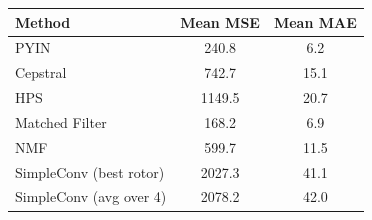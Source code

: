 \begin{tabular}{lcc}
\toprule
Method & Mean MSE & Mean MAE \\
\midrule
PYIN & 240.8 & 6.2 \\
Cepstral & 742.7 & 15.1 \\
HPS & 1149.5 & 20.7 \\
Matched Filter & 168.2 & 6.9 \\
NMF & 599.7 & 11.5 \\
SimpleConv (best rotor) & 2027.3 & 41.1 \\
SimpleConv (avg over 4) & 2078.2 & 42.0 \\
\bottomrule
\end{tabular}
